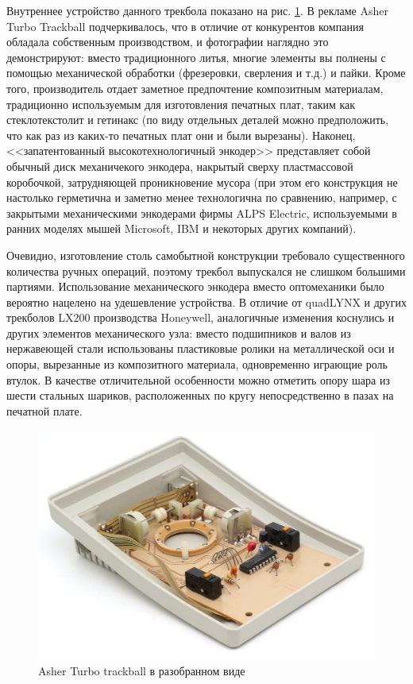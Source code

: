 \documentclass[11pt, a4paper]{article}
\begin{document}
Внутреннее устройство данного трекбола показано на рис. \ref{fig:AsherInside}. В рекламе Asher Turbo Trackball подчеркивалось, что в отличие от конкурентов компания обладала собственным производством, и фотографии наглядно это демонстрируют: вместо традиционного литья, многие элементы вы полнены с помощью механической обработки (фрезеровки, сверления и т.д.) и пайки. Кроме того,  производитель отдает заметное предпочтение композитным материалам, традиционно используемым для изготовления печатных плат, таким как стеклотекстолит и гетинакс (по виду отдельных деталей можно предположить, что как раз из каких-то печатных плат они и были вырезаны). Наконец, <<запатентованный высокотехнологичный энкодер>> представляет собой обычный диск механичекого энкодера, накрытый сверху пластмассовой коробочкой, затрудняющей проникновение мусора (при этом его конструкция не настолько герметична и заметно менее технологична по сравнению, например, с закрытыми механическими энкодерами фирмы ALPS Electric, используемыми в ранних моделях мышей Microsoft, IBM и некоторых других компаний).

Очевидно, изготовление столь самобытной конструкции требовало существенного количества ручных операций, поэтому трекбол выпускался не слишком большими партиями.
Использование механического энкодера вместо оптомеханики было вероятно нацелено на удешевление устройства. В отличие от quadLYNX и других трекболов LX200 производства Honeywell, аналогичные изменения коснулись и других элементов механического узла: вместо подшипников и валов из нержавеющей стали использованы пластиковые ролики на металлической оси и опоры, вырезанные из композитного материала, одновременно играющие роль втулок. В качестве отличительной особенности можно отметить опору шара из шести стальных шариков, расположенных по кругу непосредственно в пазах на печатной плате.

\begin{figure}[h]
    \centering
    \includegraphics[scale=0.7]{1988_asher_turbo_trackball/inside_60.jpg}
    \caption{Asher Turbo trackball в разобранном виде}
    \label{fig:AsherInside}
\end{figure}
\end{document}
